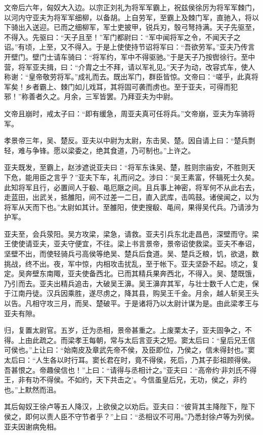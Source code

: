 \documentclass[]{article}
\begin{document}
文帝后六年，匈奴大入边。以宗正刘礼为将军军霸上，祝兹侯徐厉为将军军棘门，以河内守亚夫为将军军细柳，以备胡。上自劳军，至霸上及棘门军，直驰入，将以下骑出入送迎。已而之细柳军，军士吏披甲，锐兵刃，彀弓弩持满。天子先驱至，不得入。先驱曰：``天子且至！''军门都尉曰：``军中闻将军之令，不闻天子之诏。''有顷，上至，又不得入。于是上使使持节诏将军曰：``吾欲劳军。''亚夫乃传言开壁门。壁门士请车骑曰：``将军约，军中不得驱驰。''于是天子乃按辔徐行。至中营，将军亚夫揖，曰：``介胄之士不拜，请以军礼见。''天子为动，改容式车，使人称谢：``皇帝敬劳将军。''成礼而去。既出军门，群臣皆惊。文帝曰：``嗟乎，此真将军矣！乡者霸上、棘门如儿戏耳，其将固可袭而虏也。至于亚夫，可得而犯邪！''称善者久之。月余，三军皆罢。乃拜亚夫为中尉。

文帝且崩时，戒太子曰：``即有缓急，周亚夫真可任将兵。''文帝崩，亚夫为车骑将军。

孝景帝三年，吴、楚反。亚夫以中尉为太尉，东击吴、楚。因自请上曰：``楚兵剽轻，难与争锋。愿以梁委之，绝其食道，乃可制也。''上许之。

亚夫既发，至霸上，赵涉遮说亚夫曰：``将军东诛吴、楚，胜则宗庙安，不胜则天下危，能用臣之言乎？''亚夫下车，礼而问之。涉曰：``吴王素富，怀辑死士久矣。此知将军且行，必置间人于殽、黾厄陿之间。且兵事上神密，将军何不从此右去，走蓝田，出武关，抵雒阳，间不过差一二日，直入武库，击鸣鼓。诸侯闻之，以为将军从天而下也。''太尉如其计。至雒阳，使吏搜殽、黾间，果得吴代兵。乃请涉为护军。

亚夫至，会兵荥阳。吴方攻梁，梁急，请救。亚夫引兵东北走昌邑，深壁而守。梁王使使请亚夫，亚夫守便宜，不往。梁上书言景帝，景帝诏使救梁。亚夫不奉诏，坚壁不出，而使轻骑兵弓高侯等绝吴、楚兵后食道。吴、楚兵乏粮，饥，欲退，数挑战，终不出。夜，军中惊，内相攻击扰乱，至于帐下。亚夫坚卧不起。顷之，复定。吴奔壁东南陬，亚夫使备西北。已而其精兵果奔西北，不得入。吴、楚既饿，乃引而去。亚夫出精兵追击，大破吴王濞。吴王濞弃其军，与壮士数千人亡走，保于江南丹徒。汉兵因乘胜，遂尽虏之，降其县，购吴王千金。月余，越人斩吴王头以告。凡相守攻三月，而吴、楚破平。于是诸将乃以太尉计谋为是。由此梁孝王与亚夫有隙。

归，复置太尉官。五岁，迁为丞相，景帝甚重之。上废栗太子，亚夫固争之，不得。上由此疏之。而梁孝王每朝，常与太后言亚夫之短。窦太后曰：``皇后兄王信可侯也。''上让曰：``始南皮及章武先帝不侯，及臣即位，乃侯之，信未得封也。''窦太后曰：``人生各以时行耳。窦长君在时，竟不得侯，死后，乃其子彭祖顾得侯。吾甚恨之。帝趣侯信也！''上曰：``请得与丞相计之。''亚夫曰：``高帝约`非刘氏不得王，非有功不得侯。不如约，天下共击之'。今信虽皇后兄，无功，侯之，非约也。''上默然而沮。

其后匈奴王徐卢等五人降汉，上欲侯之以劝后。亚夫曰：``彼背其主降陛下，陛下侯之，即何以责人臣不守节者乎？''上曰：``丞相议不可用。''乃悉封徐卢等为列侯。亚夫因谢病免相。
\end{document}
